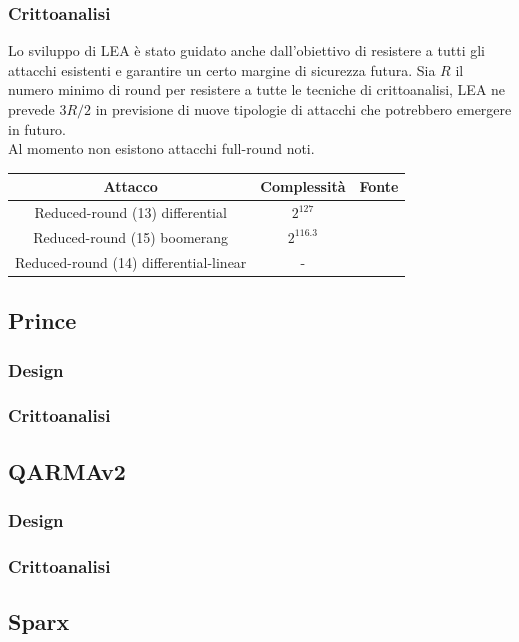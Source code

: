 \documentclass[target=bach,aauheader=,style=]{thud}
\begin{document}
			\subsubsection{Crittoanalisi}
			Lo sviluppo di LEA è stato guidato anche dall'obiettivo di resistere a tutti gli attacchi esistenti e garantire un certo margine di sicurezza futura. Sia $R$ il numero minimo di round per resistere a tutte le tecniche di crittoanalisi, LEA ne prevede $3R/2$ in previsione di nuove tipologie di attacchi che potrebbero emergere in futuro.\\
			Al momento non esistono attacchi full-round noti.
			\begin{center}
				\begin{tabular}{ |c|c|c| } 
					\hline
					Attacco & Complessità & Fonte \\ 
					\hline 
					\hline
					Reduced-round (13) differential & $2^{127}$ & \cite{leadiff} \\
					\hline
					Reduced-round (15) boomerang & $2^{116.3}$ & \cite{lea} \\
					\hline
					Reduced-round (14) differential-linear & - & \cite{lea} \\
					\hline
				\end{tabular}
			\end{center}
		\subsection{Prince\cite{prince}}
			\subsubsection{Design}
			\subsubsection{Crittoanalisi}
		\subsection{QARMAv2\cite{qarmav2}}
			\subsubsection{Design}
			\subsubsection{Crittoanalisi}
		\subsection{Sparx\cite{sparx}}
\end{document}
